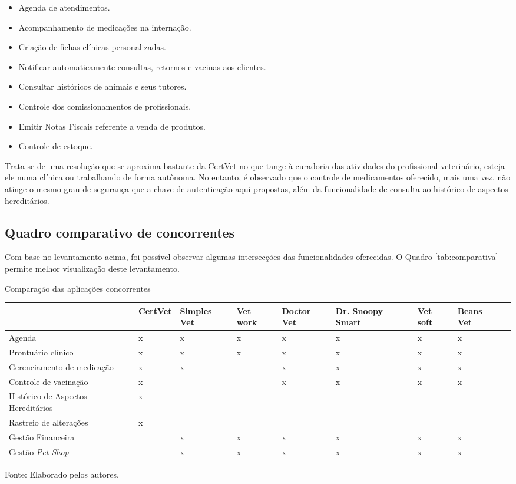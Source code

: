\documentclass[
    12pt,               %
    openright,          %
    oneside,
    a4paper,            %
    BIBLATEX,           %
    TODO,               %
    english,            %
    brazil              %
    ]{ifsp-spo-inf-ctds}
\begin{document}
\begin{itemize}
    \item Agenda de atendimentos.
    \item Acompanhamento de medicações na internação.
    \item Criação de fichas clínicas personalizadas.
    \item Notificar automaticamente consultas, retornos e vacinas aos clientes.
    \item Consultar históricos de animais e seus tutores.
    \item Controle dos comissionamentos de profissionais.
    \item Emitir Notas Fiscais referente a venda de produtos.
    \item Controle de estoque.
\end{itemize}

    Trata-se de uma resolução que se aproxima bastante da CertVet no que tange à curadoria das atividades do profissional veterinário, esteja ele numa clínica ou trabalhando de forma autônoma. No entanto, é observado que o controle de medicamentos oferecido, mais uma vez, não atinge o mesmo grau de segurança que a chave de autenticação aqui propostas, além da funcionalidade de consulta ao histórico de aspectos hereditários.

    \subsection{Quadro comparativo de concorrentes}
    Com base no levantamento acima, foi possível observar algumas intersecções das funcionalidades oferecidas. O Quadro \ref{tab:comparativa} permite melhor visualização deste levantamento.

    \begin{center}
    \begin{quadro}[H]
     \caption{Comparação das aplicações concorrentes}
    \label{tab:comparativa}
    \begin{tabulary}{1.0\textwidth}{|L|L|L|L|L|L|L|L|L|}
    \hline
     & CertVet & Simples Vet & Vet work & Doctor Vet & Dr. Snoopy Smart & Vet soft & Beans Vet\\
    \hline
    Agenda & x & x & x & x & x & x & x\\
    \hline
    Prontuário clínico & x & x & x & x & x & x & x\\
    \hline
    Gerenciamento de medicação & x & x &  & x & x & x & x\\
    \hline
    Controle de vacina\c{c}ão & x &  &  & x & x & x & x\\
    \hline
    Histórico de Aspectos Hereditários & x &  &  &  &  &  & \\
    \hline
    Rastreio de alterações & x &  &  &  &  &  & \\
    \hline
    Gestão Financeira &  & x & x & x & x & x & x\\
    \hline
    Gestão \emph{Pet Shop} &  & x & x & x & x & x & x\\
    \hline
    \end{tabulary}
    \centering
    {\footnotesize Fonte: Elaborado pelos autores.}
    \end{quadro}
\end{center}
\end{document}
